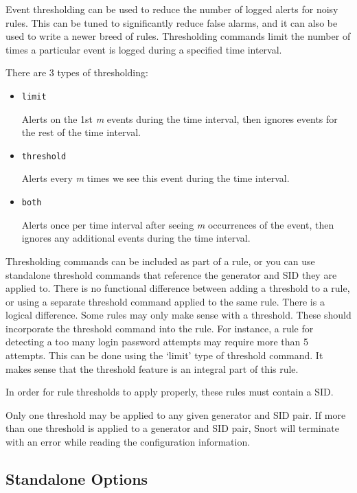 \documentclass[english]{report}
\begin{document}
Event thresholding can be used to reduce the number of logged alerts for noisy
rules.  This can be tuned to significantly reduce false alarms, and it can also
be used to write a newer breed of rules. Thresholding commands limit the number
of times a particular event is logged during a specified time interval. 

There are 3 types of thresholding:

\begin{itemize} 

\item \texttt{limit} 

Alerts on the 1st \textit{m} events during the time interval, then ignores events for the
rest of the time interval.

\item \texttt{threshold} 

Alerts every \textit{m} times we see this event during the time interval.

\item \texttt{both} 

Alerts once per time interval after seeing \textit{m} occurrences of the event, then
ignores any additional events during the time interval.
\end{itemize}


Thresholding commands can be included as part of a rule, or you can use
standalone threshold commands that reference the generator and SID they are
applied to. There is no functional difference between adding a threshold to a
rule, or using a separate threshold command applied to the same rule.   There
is a logical difference.  Some rules may only make sense with a threshold.
These should incorporate the threshold command into the rule.  For instance, a
rule for detecting a too many login password attempts may require more than 5
attempts.  This can be done using the `limit' type of threshold command.  It
makes sense that the threshold feature is an integral part of this rule.

In order for rule thresholds to apply properly, these rules must contain a
SID.

Only one threshold may be applied to any given generator and SID pair.  If more
than one threshold is applied to a generator and SID pair, Snort will terminate
with an error while reading the configuration information. 
                 
\subsection{Standalone Options}
\end{document}
